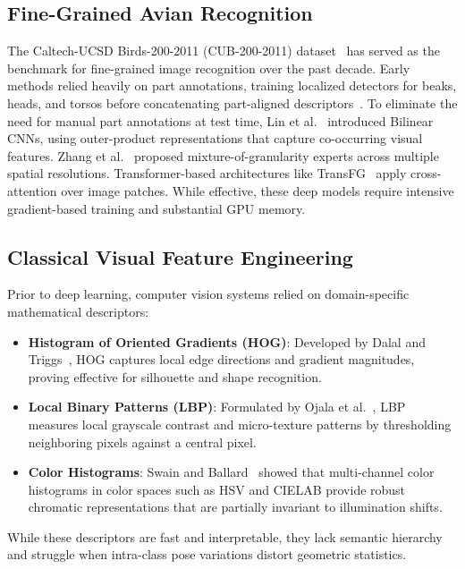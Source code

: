 \documentclass[conference]{IEEEtran}
\begin{document}
\subsection{Fine-Grained Avian Recognition}
The Caltech-UCSD Birds-200-2011 (CUB-200-2011) dataset~\cite{wah2011cub} has served as the benchmark for fine-grained image recognition over the past decade. Early methods relied heavily on part annotations, training localized detectors for beaks, heads, and torsos before concatenating part-aligned descriptors~\cite{zhang2014part}. To eliminate the need for manual part annotations at test time, Lin et al.~\cite{lin2015bilinear} introduced Bilinear CNNs, using outer-product representations that capture co-occurring visual features. Zhang et al.~\cite{zhang2019part} proposed mixture-of-granularity experts across multiple spatial resolutions. Transformer-based architectures like TransFG~\cite{he2021transfg} apply cross-attention over image patches. While effective, these deep models require intensive gradient-based training and substantial GPU memory.

\subsection{Classical Visual Feature Engineering}
Prior to deep learning, computer vision systems relied on domain-specific mathematical descriptors:
\begin{itemize}
    \item \textbf{Histogram of Oriented Gradients (HOG)}: Developed by Dalal and Triggs~\cite{dalal2005hog}, HOG captures local edge directions and gradient magnitudes, proving effective for silhouette and shape recognition.
    \item \textbf{Local Binary Patterns (LBP)}: Formulated by Ojala et al.~\cite{ojala2002lbp}, LBP measures local grayscale contrast and micro-texture patterns by thresholding neighboring pixels against a central pixel.
    \item \textbf{Color Histograms}: Swain and Ballard~\cite{swain1991color} showed that multi-channel color histograms in color spaces such as HSV and CIELAB provide robust chromatic representations that are partially invariant to illumination shifts.
\end{itemize}
While these descriptors are fast and interpretable, they lack semantic hierarchy and struggle when intra-class pose variations distort geometric statistics.
\end{document}
